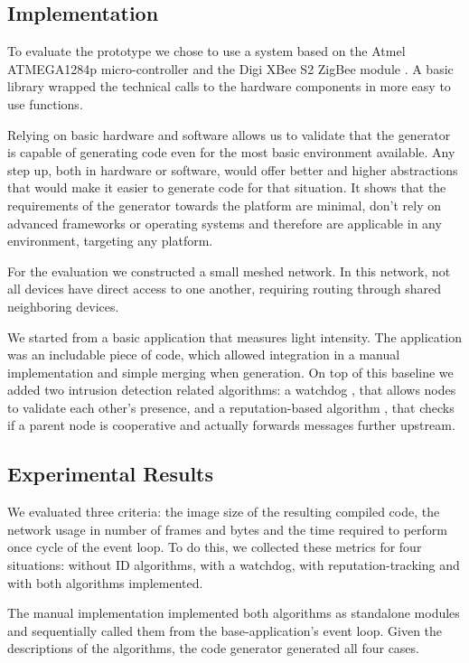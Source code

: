 \documentclass[conference]{IEEEtran}
\begin{document}
\subsection{Implementation}

To evaluate the prototype we chose to use a system based on the Atmel
ATMEGA1284p micro-controller \cite{datasheet:atmega1284p} and the Digi XBee S2
ZigBee module \cite{manual:xbee}. A basic library wrapped the technical calls
to the hardware components in more easy to use functions.

Relying on basic hardware and software allows us to validate that the generator
is capable of generating code even for the most basic environment available.
Any step up, both in hardware or software, would offer better and higher
abstractions that would make it easier to generate code for that situation. It
shows that the requirements of the generator towards the platform are minimal,
don't rely on advanced frameworks or operating systems and therefore are
applicable in any environment, targeting any platform.

For the evaluation we constructed a small meshed network. In this network, not
all devices have direct access to one another, requiring routing through shared
neighboring devices.

We started from a basic application that measures light intensity. The
application was an includable piece of code, which allowed integration in a
manual implementation and simple merging when generation. On top of this
baseline we added two intrusion detection related algorithms: a
watchdog \cite{mishra2004intrusion}, that allows nodes to validate each other's
presence, and a reputation-based algorithm \cite{ganeriwal2008reputation}, that
checks if a parent node is cooperative and actually forwards messages further
upstream.

\subsection{Experimental Results}

We evaluated three criteria: the image size of the resulting compiled code, the
network usage in number of frames and bytes and the time required to perform
once cycle of the event loop. To do this, we collected these metrics for four
situations: without ID algorithms, with a watchdog, with reputation-tracking
and with both algorithms implemented.

The manual implementation implemented both algorithms as standalone modules and
sequentially called them from the base-application's event loop. Given the
\NAME descriptions of the algorithms, the code generator generated all four
cases.
\end{document}
